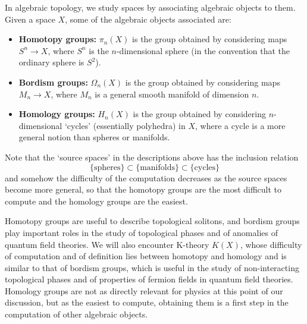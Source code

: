 \documentclass[12pt]{article}
\numberwithin{equation}{section}
\numberwithin{figure}{section}
\theoremstyle{remark}
\begin{document}
In algebraic topology, we study spaces by associating algebraic objects to them.
Given a space $X$, some of the algebraic objects associated are:
\begin{itemize}
\item \textbf{Homotopy groups:} $\pi_n(X)$ is the group obtained by considering maps $S^n \to X$,
where $S^n$ is the $n$-dimensional sphere (in the convention that the ordinary sphere is $S^2$).
\item \textbf{Bordism groups:} $\Omega_n(X)$ is the group obtained by considering maps $M_n \to X$,
where $M_n$ is a general smooth manifold of dimension $n$.
\item \textbf{Homology groups:} $H_n(X)$ is the group obtained by considering $n$-dimensional `cycles' (essentially polyhedra)
 in $X$, where a cycle is a more general notion than spheres or manifolds.
\end{itemize}
Note that the `source spaces' in the descriptions above has the inclusion relation \begin{equation}
  \{\text{spheres}\} \subset \{\text{manifolds}\} \subset \{\text{cycles}\}
\end{equation} and somehow the difficulty of the computation decreases as the source spaces become more general,
so that the homotopy groups are the most difficult to compute and the homology groups are the easiest.

Homotopy groups are useful to describe topological solitons,
and bordism groups play important roles in the study of topological phases
and of anomalies of quantum field theories.
We will also encounter K-theory $K(X)$, whose difficulty of computation and of definition lies between homotopy and homology
and is similar to that of bordism groups, 
which is useful in the study of non-interacting topological phases
and of properties of fermion fields in quantum field theories.
Homology groups are not as directly relevant for physics at this point of our discussion,
but as the easiest to compute, obtaining them is a first step in the computation of other algebraic objects.
\end{document}
